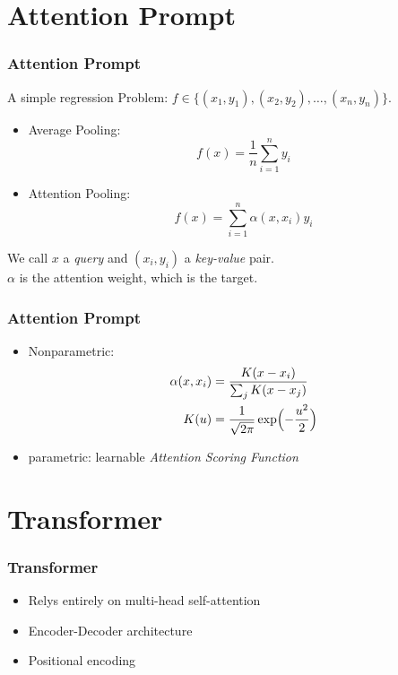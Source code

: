 \documentclass[]{beamer}
\begin{document}
\section{Attention Prompt}
\begin{frame}
    \frametitle{Attention Prompt}
    A simple regression Problem: $f \in \{(x_1, y_1), (x_2, y_2), \ldots, (x_n, y_n)\}$.
    \begin{itemize}[label = \textbullet]
        \item Average Pooling: 
            \[f(x) = \frac{1}{n} \sum_{i=1}^n y_i\]
        \item Attention Pooling: 
            \[f(x) = \sum_{i=1}^n \alpha(x, x_i) y_i \]
    \end{itemize}
    We call $x$ a \emph{query} and $(x_i, y_i)$ a \emph{key-value} pair. \\
    $\alpha$ is the attention weight, which is the target.
\end{frame}
\begin{frame}
    \frametitle{Attention Prompt}
    \begin{itemize}[label=\textbullet]
        \item Nonparametric: 
            \begin{align*}
                \alpha(x, x_i) &= \frac{K(x-x_i)}{\sum_{j} K(x-x_j)} \\
                K(u) &= \frac{1}{\sqrt{2\pi}} \exp \Bigl(-\frac{u^2}{2}\Bigr)
            \end{align*}
        \item parametric: learnable \emph{Attention Scoring Function}
    \end{itemize}
\end{frame}

\section{Transformer}
\begin{frame}
    \frametitle{Transformer}
    \begin{itemize}[label = \textbullet]
        \item Relys entirely on multi-head self-attention
        \item Encoder-Decoder architecture
        \item Positional encoding
    \end{itemize}
\end{frame}
\end{document}
